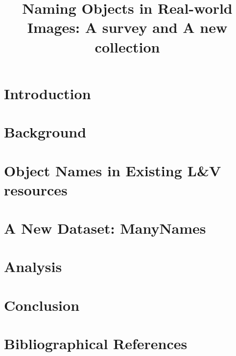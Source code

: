 \documentclass[10pt, a4paper]{article}
\title{Naming Objects in Real-world Images: A survey and A new \sz{linguistically motivated????} collection}
\begin{document}
\maketitleabstract

\section{Introduction}


\section{Background}
\label{sec:rel-work}


\section{Object Names in Existing L\&V resources}


\section{A New Dataset: ManyNames}
\label{sec:data}

	
\section{Analysis}
\label{sec:analysis}


\section{Conclusion}
\label{sec:conc}




\section{Bibliographical References}
\label{main:ref}





\end{document}
